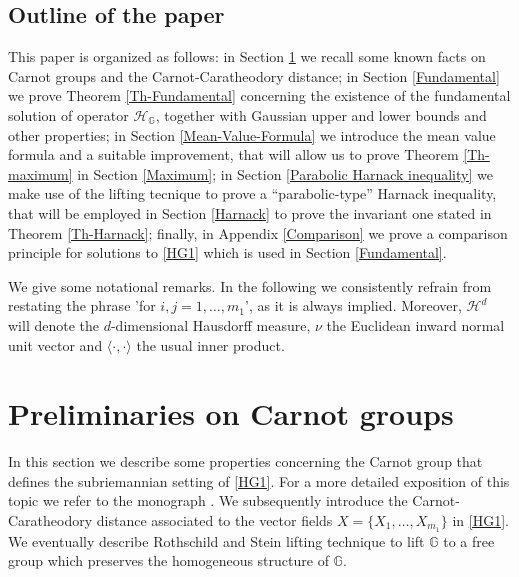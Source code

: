 \documentclass[11pt,a4paper]{article}
\numberwithin{equation}{section}
\def \GG {{\mathbb{G}}}
\def \H {\mathscr{H}_\GG}
\begin{document}
\subsection{Outline of the paper}
This paper is organized as follows: in Section \ref{Carnot} we  recall some known facts on Carnot groups and the Carnot-Caratheodory distance; in Section \ref{Fundamental} we prove Theorem \ref{Th-Fundamental} concerning the existence of the fundamental solution of operator $\H$, together with Gaussian upper and lower bounds and other properties; in Section \ref{Mean-Value-Formula} we introduce the mean value formula and a suitable improvement, that will allow us to prove Theorem \ref{Th-maximum} in Section \ref{Maximum}; in Section \ref{Parabolic Harnack inequality} we make use of the lifting tecnique to prove a “parabolic-type” Harnack inequality, that will be employed in Section \ref{Harnack} to prove the invariant one stated in Theorem \ref{Th-Harnack}; finally, in Appendix \ref{Comparison} we prove a comparison principle for solutions to \eqref{HG1} which is used in Section \ref{Fundamental}.
 


\medskip  We give some notational remarks. In the following we consistently refrain from restating the phrase  'for $i,j=1,\ldots,m_1$', as it is always implied. Moreover, $\mathcal{H}^{d}$ will denote the $d$-dimensional Hausdorff measure, $\nu$ the Euclidean inward normal unit vector and $\langle \cdot,\cdot\rangle$ the usual inner product. 

































\section{Preliminaries on Carnot groups}\label{Carnot}
In this section we describe some properties concerning the Carnot group that defines the subriemannian setting of \eqref{HG1}. For a more detailed exposition of this topic we refer to the monograph \cite{bonfiglioli2007stratified}. We subsequently introduce the Carnot-Caratheodory distance associated to the vector fields $X = \{ X_1, \ldots, X_{m_1} \}$ in \eqref{HG1}. We eventually describe Rothschild and Stein lifting technique \cite{rothschild1976hypoelliptic} to lift $\GG$ to a free group which preserves the homogeneous structure of $\GG$.
\end{document}
